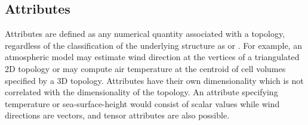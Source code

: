 \subsection{Attributes}
Attributes are defined as any numerical quantity associated with a
topology, regardless of the classification of the underlying structure
as \cgrid{} or \ugrid{}. For example, an atmospheric model may
estimate wind direction at the vertices of a triangulated 2D topology
or may compute air temperature at the centroid of cell volumes
specified by a 3D topology. Attributes have their own dimensionality
which is not correlated with the dimensionality of the topology. An
attribute specifying temperature or sea-surface-height would consist
of scalar values while wind directions are vectors, and tensor attributes
are also possible.
